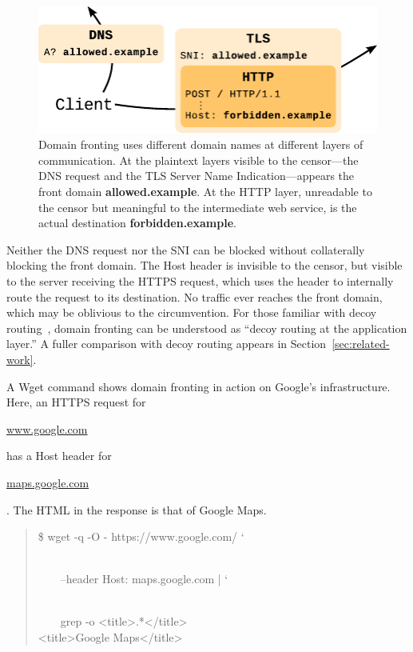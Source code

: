 \documentclass[conference]{IEEEtran}
\def\urll#1{\begin{NoHyper}\url{#1}\end{NoHyper}}
\begin{document}
\begin{figure}[ht]
\centering
\includegraphics[width=\linewidth]{fronting}
\caption{
Domain fronting uses different domain names at different layers of communication.
At the plaintext layers visible to the censor---the DNS request and the
TLS Server Name Indication---appears
the front domain \mbox{\textbf{allowed.example}}.
At the HTTP layer, unreadable to the censor but meaningful to the intermediate web service,
is the actual destination \mbox{\textbf{forbidden.example}}.
}
\label{fig:fronting}
\end{figure}

Neither the DNS request nor the SNI can be blocked without
collaterally blocking the front domain.
The Host header is invisible to the censor,
but visible to the server receiving the HTTPS request,
which uses the header to internally route the request to its destination.
No traffic ever reaches the front domain,
which may be oblivious to the circumvention.
For those familiar with decoy routing~\cite{decoyrouting,telex,cirripede,tapdance},
domain fronting can be understood as
``decoy routing at the application layer.''
A fuller comparison with decoy routing appears in Section~\ref{sec:related-work}.

A Wget command shows domain fronting in action
on Google's infrastructure.
Here, an HTTPS request for \urll{www.google.com} has a Host header for
\urll{maps.google.com}. The HTML in the response is that of Google Maps.

\noindent
\begin{quote}
%
\$ wget -q -O - https://www.google.com/ \char`\\\\
\strut~~~~--header \textquotesingle{}Host: maps.google.com\textquotesingle{} | \char`\\\\
\strut~~~~grep -o \textquotesingle{}<title>.*</title>\textquotesingle{}\\
<title>Google Maps</title>
\end{quote}
\end{document}
